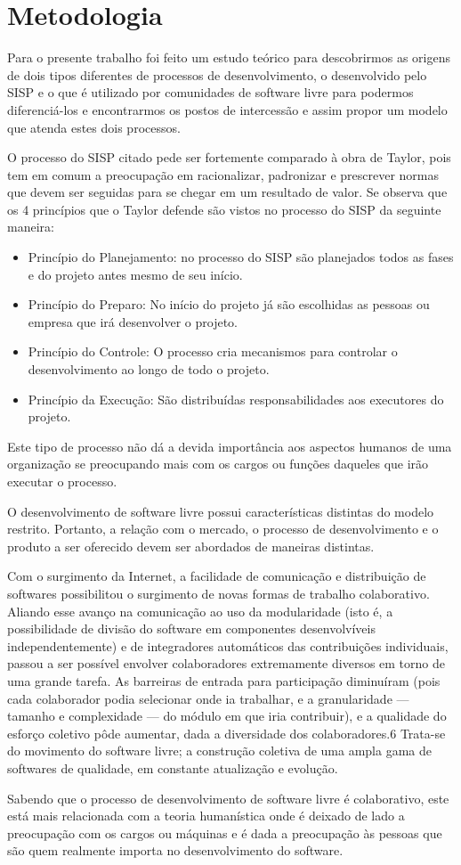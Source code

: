 \chapter{Metodologia}

Para o presente trabalho foi feito um estudo teórico para descobrirmos as origens
de dois tipos diferentes de processos de desenvolvimento, o desenvolvido pelo 
SISP e o que é utilizado por comunidades de software livre para podermos diferenciá-los
e encontrarmos os postos de intercessão e assim propor um modelo que atenda estes dois 
processos.

O processo do SISP citado pede ser fortemente comparado à obra de Taylor, pois 
tem em comum a preocupação em racionalizar, padronizar e prescrever normas que
devem ser seguidas para se chegar em um resultado de valor.
%
Se observa que os 4 princípios que o Taylor defende são vistos no processo do SISP
da seguinte maneira: 
\begin{itemize}
\item Princípio do Planejamento: no processo do SISP são planejados todos as fases
e do projeto antes mesmo de seu início.
\item Princípio do Preparo: No início do projeto já são escolhidas as pessoas 
ou empresa que irá desenvolver o projeto.
\item Princípio do Controle: O processo cria mecanismos para controlar o desenvolvimento
ao longo de todo o projeto.
\item Princípio da Execução: São distribuídas responsabilidades aos executores do projeto. 
\end{itemize}

Este tipo de processo não dá a devida importância aos aspectos humanos de uma organização
se preocupando mais com os cargos ou funções daqueles que irão executar o processo.

O desenvolvimento de software livre possui características distintas do modelo restrito. Portanto,
a relação com o mercado, o processo de desenvolvimento e o produto a ser oferecido devem ser
abordados de maneiras distintas.\cite{meirelles2013metrics}

Com o surgimento da Internet, a facilidade de comunicação e distribuição de 
softwares possibilitou o surgimento de novas formas de trabalho colaborativo.
Aliando esse avanço na comunicação ao uso da modularidade (isto é, a possibilidade 
de divisão do software em componentes desenvolvíveis independentemente) e de 
integradores automáticos das contribuições individuais, passou a ser possível 
envolver colaboradores extremamente diversos em torno de uma grande tarefa. 
As barreiras de entrada para participação diminuíram (pois cada colaborador podia 
selecionar onde ia trabalhar, e a granularidade — tamanho e complexidade — do módulo 
em que iria contribuir), e a qualidade do esforço coletivo pôde aumentar, dada a 
diversidade dos colaboradores.6 Trata-se do movimento do software livre; 
a construção coletiva de uma ampla gama de softwares de qualidade, em constante 
atualização e evolução.\cite{simon2010rossio}

Sabendo que o processo de desenvolvimento de software livre é colaborativo, este 
está mais relacionada com a teoria humanística onde é deixado de lado a preocupação
com os cargos ou máquinas e é dada a preocupação às pessoas que são quem realmente
importa no desenvolvimento do software.


 
